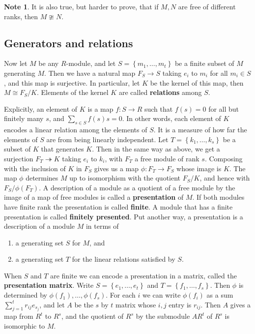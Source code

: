 \documentclass{article}
\newcommand{\rb}[1]{\left( #1 \right)}
\newcommand{\cb}[1]{\left\{ #1 \right\}}
\theoremstyle{definition}\newtheorem{definition}{Definition}[subsection]
\theoremstyle{definition}\newtheorem{remark}[definition]{Remark}
\theoremstyle{definition}\newtheorem*{example}{Example}
\theoremstyle{definition}\newtheorem*{note}{Note}
\begin{document}
\begin{note}
It is also true, but harder to prove, that if $ M, N $ are free of different ranks, then $ M \ncong N $.
\end{note}

\subsection{Generators and relations}

Now let $ M $ be any $ R $-module, and let $ S = \cb{m_1, \dots, m_t} $ be a finite subset of $ M $ generating $ M $. Then we have a natural map $ F_S \to S $ taking $ e_i $ to $ m_i $ for all $ m_i \in S $, and this map is surjective. In particular, let $ K $ be the kernel of this map, then $ M \cong F_S / K $. Elements of the kernel $ K $ are called \textbf{relations} among $ S $.


Explicitly, an element of $ K $ is a map $ f : S \to R $ such that $ f\rb{s} = 0 $ for all but finitely many $ s $, and $ \sum_{s \in S} f\rb{s}s = 0 $. In other words, each element of $ K $ encodes a linear relation among the elements of $ S $. It is a measure of how far the elements of $ S $ are from being linearly independent. Let $ T = \cb{k_1, \dots, k_s} $ be a subset of $ K $ that generates $ K $. Then in the same way as above, we get a surjection $ F_T \twoheadrightarrow K $ taking $ e_i $ to $ k_i $, with $ F_T $ a free module of rank $ s $. Composing with the inclusion of $ K $ in $ F_S $ gives us a map $ \phi : F_T \to F_S $ whose image is $ K $. The map $ \phi $ determines $ M $ up to isomorphism with the quotient $ F_S / K $, and hence with $ F_S / \phi\rb{F_T} $. A description of a module as a quotient of a free module by the image of a map of free modules is called a \textbf{presentation} of $ M $. If both modules have finite rank the presentation is called \textbf{finite}. A module that has a finite presentation is called \textbf{finitely presented}. Put another way, a presentation is a description of a module $ M $ in terms of
\begin{enumerate}
\item a generating set $ S $ for $ M $, and
\item a generating set $ T $ for the linear relations satisfied by $ S $.
\end{enumerate}
When $ S $ and $ T $ are finite we can encode a presentation in a matrix, called the \textbf{presentation matrix}. Write $ S = \cb{e_1, \dots, e_t} $ and $ T = \cb{f_1, \dots, f_s} $. Then $ \phi $ is determined by $ \phi\rb{f_1}, \dots, \phi\rb{f_s} $. For each $ i $ we can write $ \phi\rb{f_i} $ as a sum $ \sum_{j = 1}^t r_{ij}e_{s_j} $, and let $ A $ be the $ s $ by $ t $ matrix whose $ i, j $ entry is $ r_{ij} $. Then $ A $ gives a map from $ R^t $ to $ R^s $, and the quotient of $ R^s $ by the submodule $ AR^t $ of $ R^s $ is isomorphic to $ M $.
\end{document}
